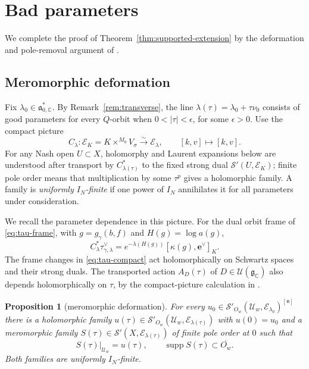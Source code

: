 \documentclass[a4paper,12pt]{amsart}
\numberwithin{equation}{section}
\newtheorem{proposition}[theorem]{Proposition}
\theoremstyle{definition}
\theoremstyle{remark}
\newcommand{\C}{\mathbb C}
\newcommand{\fg}{\mathfrak g}
\newcommand{\fn}{\mathfrak n}
\newcommand{\fa}{\mathfrak a}
\newcommand{\IN}{I_N}
\newcommand{\mcU}{\mathcal U}
\newcommand{\mcS}{\mathcal S}
\newcommand{\mcE}{\mathcal E}
\newcommand{\supp}{\operatorname{supp}}
\begin{document}
\section{Bad parameters}\label{sec:bad}

We complete the proof of Theorem~\ref{thm:supported-extension} by the deformation and pole-removal argument of \cite[Lemmas~4.5--4.6]{Abe12}.

\subsection{Meromorphic deformation}\label{ssec:deformation}

Fix $\lambda_0\in\fa_{0,\C}^*$. By Remark~\ref{rem:transverse}, the line $\lambda(\tau)=\lambda_0+\tau\nu_0$ consists of good parameters for every $Q$-orbit when $0<|\tau|<\epsilon$, for some $\epsilon>0$. Use the compact picture
\[
 C_\lambda:\mcE_K=K\times^{M_0}V_\sigma\xrightarrow{\sim}\mcE_\lambda,
 \qquad [k,v]\longmapsto[k,v].
\]
For any Nash open $U\subset X$, holomorphy and Laurent expansions below are understood after transport by $C_{\lambda(\tau)}^*$ to the fixed strong dual $\mcS'(U,\mcE_K)$; finite pole order means that multiplication by some $\tau^p$ gives a holomorphic family. A family is \emph{uniformly $\IN$-finite} if one power of $\IN$ annihilates it for all parameters under consideration.

We recall the parameter dependence in this picture. For the dual orbit frame of \eqref{eq:tau-frame}, with $g=g_\gamma(b,f)$ and $H(g)=\log a(g)$,
\begin{equation}\label{eq:tau-compact}
 C_\lambda^*\tau_{\gamma,\lambda}^\vee
 =e^{-\lambda(H(g))}[\kappa(g),\mathbf e^\vee]_K.
\end{equation}
The frame changes in \eqref{eq:tau-compact} act holomorphically on Schwartz spaces and their strong duals. The transported action $A_D(\tau)$ of $D\in\mcU(\fg_\C)$ also depends holomorphically on $\tau$, by the compact-picture calculation in \cite[p.~444]{Abe12}.

\begin{proposition}[meromorphic deformation]\label{prop:meromorphic-deformation}
For every $u_0\in\mcS'_{O_w}(\mcU_w,\mcE_{\lambda_0})^{[\fn]}$ there is a holomorphic family $u(\tau)\in\mcS'_{O_w}(\mcU_w,\mcE_{\lambda(\tau)})$ with $u(0)=u_0$ and a meromorphic family $S(\tau)\in\mcS'(X,\mcE_{\lambda(\tau)})$ of finite pole order at $0$ such that
\[
 S(\tau)|_{\mcU_w}=u(\tau),\qquad
 \supp S(\tau)\subset\overline{O_w}.
\]
Both families are uniformly $\IN$-finite.
\end{proposition}
\end{document}
